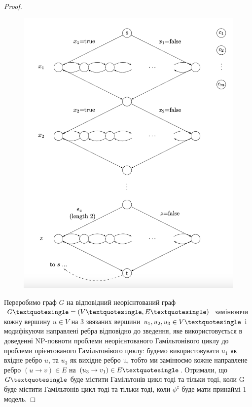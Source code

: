 \begin{proof}
\begin{figure}[ht]
    \centering
    \includegraphics[scale=0.5]{Images/graph.jpg}
    \label{graph}
\end{figure}

Переробимо граф $G$ на відповідний неорієнтований граф $G\textquotesingle=(V\textquotesingle, E\textquotesingle)$
замінюючи кожну вершину $u \in V$ на 3 звязаних вершини $u_{1}, u_{2}, u_{3} \in V\textquotesingle$
і модифікуючи направлені ребра відповідно до зведення, яке використовується в доведенні
NP-повноти проблеми неорієнтованого Гамільтонівого циклу до проблеми орієнтованого Гамільтонівого
циклу: будемо використовувати $u_{1}$ як вхідне ребро $u$, та $u_{3}$ як вихідне ребро u,
тобто ми замінюємо кожне направлене ребро $(u \to v) \in E$ на $(u_{3} \to v_{1}) \in E\textquotesingle$.
Отримали, що $G\textquotesingle$ буде містити Гамільтонів цикл тоді та тільки тоді, коли G буде містити 
Гамільтонів цикл тоді та тільки тоді, коли $\phi^{z}$ буде мати принаймі 1 модель.


\end{proof}
